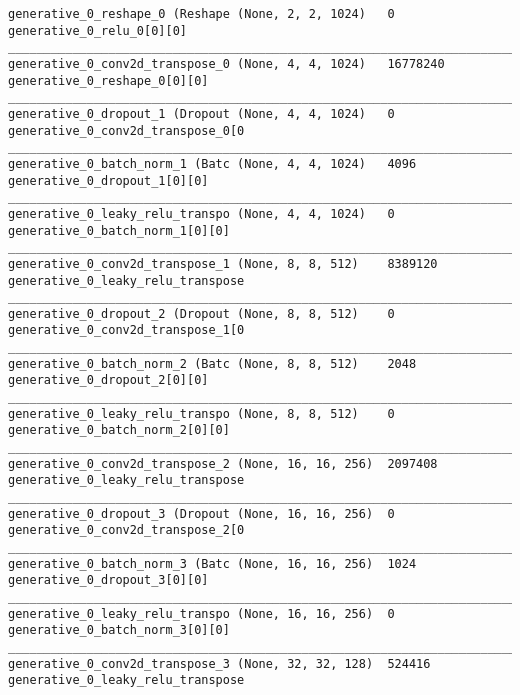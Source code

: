 \begin{lstlisting}[caption={dSprites-\ac{VLAE} Decoder},captionpos=b,basicstyle=\tiny, label={lst:dsprites-vlae-decoder}]
generative_0_reshape_0 (Reshape (None, 2, 2, 1024)   0           generative_0_relu_0[0][0]
__________________________________________________________________________________________________
generative_0_conv2d_transpose_0 (None, 4, 4, 1024)   16778240    generative_0_reshape_0[0][0]
__________________________________________________________________________________________________
generative_0_dropout_1 (Dropout (None, 4, 4, 1024)   0           generative_0_conv2d_transpose_0[0
__________________________________________________________________________________________________
generative_0_batch_norm_1 (Batc (None, 4, 4, 1024)   4096        generative_0_dropout_1[0][0]
__________________________________________________________________________________________________
generative_0_leaky_relu_transpo (None, 4, 4, 1024)   0           generative_0_batch_norm_1[0][0]
__________________________________________________________________________________________________
generative_0_conv2d_transpose_1 (None, 8, 8, 512)    8389120     generative_0_leaky_relu_transpose
__________________________________________________________________________________________________
generative_0_dropout_2 (Dropout (None, 8, 8, 512)    0           generative_0_conv2d_transpose_1[0
__________________________________________________________________________________________________
generative_0_batch_norm_2 (Batc (None, 8, 8, 512)    2048        generative_0_dropout_2[0][0]
__________________________________________________________________________________________________
generative_0_leaky_relu_transpo (None, 8, 8, 512)    0           generative_0_batch_norm_2[0][0]
__________________________________________________________________________________________________
generative_0_conv2d_transpose_2 (None, 16, 16, 256)  2097408     generative_0_leaky_relu_transpose
__________________________________________________________________________________________________
generative_0_dropout_3 (Dropout (None, 16, 16, 256)  0           generative_0_conv2d_transpose_2[0
__________________________________________________________________________________________________
generative_0_batch_norm_3 (Batc (None, 16, 16, 256)  1024        generative_0_dropout_3[0][0]
__________________________________________________________________________________________________
generative_0_leaky_relu_transpo (None, 16, 16, 256)  0           generative_0_batch_norm_3[0][0]
__________________________________________________________________________________________________
generative_0_conv2d_transpose_3 (None, 32, 32, 128)  524416      generative_0_leaky_relu_transpose

\end{lstlisting}
